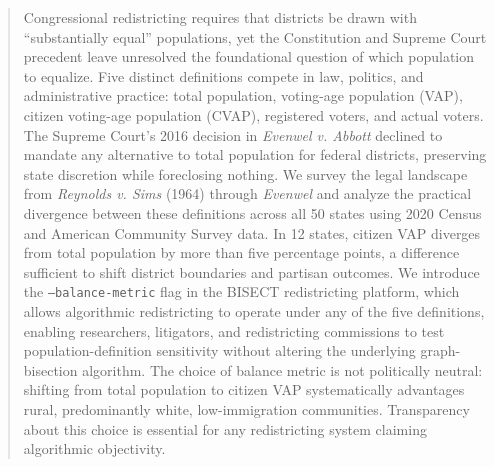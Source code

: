 \begin{abstract}
Congressional redistricting requires that districts be drawn with ``substantially equal'' populations, yet the Constitution and Supreme Court precedent leave unresolved the foundational question of which population to equalize. Five distinct definitions compete in law, politics, and administrative practice: total population, voting-age population (VAP), citizen voting-age population (CVAP), registered voters, and actual voters. The Supreme Court's 2016 decision in \emph{Evenwel v. Abbott} declined to mandate any alternative to total population for federal districts, preserving state discretion while foreclosing nothing. We survey the legal landscape from \emph{Reynolds v. Sims} (1964) through \emph{Evenwel} and analyze the practical divergence between these definitions across all 50 states using 2020 Census and American Community Survey data. In 12 states, citizen VAP diverges from total population by more than five percentage points, a difference sufficient to shift district boundaries and partisan outcomes. We introduce the \texttt{--balance-metric} flag in the BISECT redistricting platform, which allows algorithmic redistricting to operate under any of the five definitions, enabling researchers, litigators, and redistricting commissions to test population-definition sensitivity without altering the underlying graph-bisection algorithm. The choice of balance metric is not politically neutral: shifting from total population to citizen VAP systematically advantages rural, predominantly white, low-immigration communities. Transparency about this choice is essential for any redistricting system claiming algorithmic objectivity.
\end{abstract}
